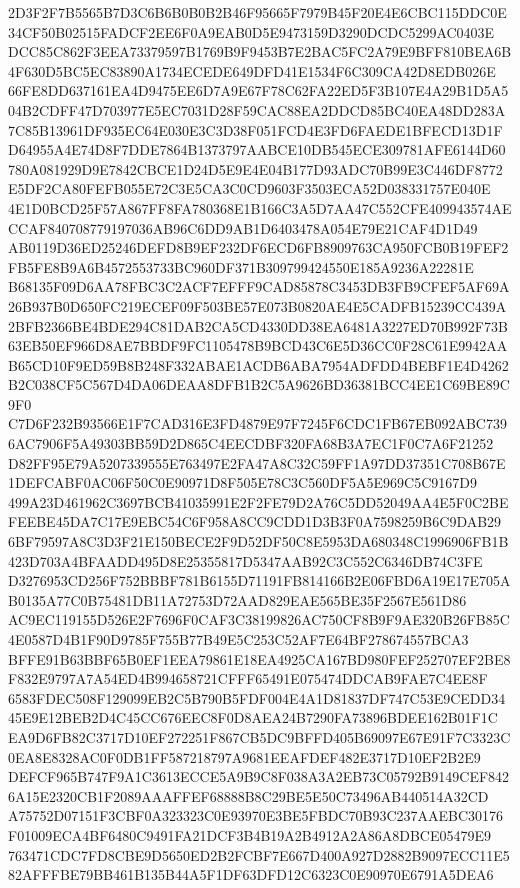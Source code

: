 \documentclass[UTF8,fontset=fandol,zihao=-4,a4paper]{ctexart}
\begin{document}
{{2D3F2F7B5565B7D3C6B6B0B0B2B46F95665F7979B45F20E4E6CBC115DDC0E34CF50B02515FADCF2EE6F0A9EAB0D5E9473159D3290DCDC5299AC0403E
DCC85C862F3EEA73379597B1769B9F9453B7E2BAC5FC2A79E9BFF810BEA6B4F630D5BC5EC83890A1734ECEDE649DFD41E1534F6C309CA42D8EDB026E
66FE8DD637161EA4D9475EE6D7A9E67F78C62FA22ED5F3B107E4A29B1D5A504B2CDFF47D703977E5EC7031D28F59CAC88EA2DDCD85BC40EA48DD283A
7C85B13961DF935EC64E030E3C3D38F051FCD4E3FD6FAEDE1BFECD13D1FD64955A4E74D8F7DDE7864B1373797AABCE10DB545ECE309781AFE6144D60
780A081929D9E7842CBCE1D24D5E9E4E04B177D93ADC70B99E3C446DF8772E5DF2CA80FEFB055E72C3E5CA3C0CD9603F3503ECA52D038331757E040E
4E1D0BCD25F57A867FF8FA780368E1B166C3A5D7AA47C552CFE409943574AECCAF840708779197036AB96C6DD9AB1D6403478A054E79E21CAF4D1D49
AB0119D36ED25246DEFD8B9EF232DF6ECD6FB8909763CA950FCB0B19FEF2FB5FE8B9A6B4572553733BC960DF371B309799424550E185A9236A22281E
B68135F09D6AA78FBC3C2ACF7EFFF9CAD85878C3453DB3FB9CFEF5AF69A26B937B0D650FC219ECEF09F503BE57E073B0820AE4E5CADFB15239CC439A
2BFB2366BE4BDE294C81DAB2CA5CD4330DD38EA6481A3227ED70B992F73B63EB50EF966D8AE7BBDF9FC1105478B9BCD43C6E5D36CC0F28C61E9942AA
B65CD10F9ED59B8B248F332ABAE1ACDB6ABA7954ADFDD4BEBF1E4D4262B2C038CF5C567D4DA06DEAA8DFB1B2C5A9626BD36381BCC4EE1C69BE89C9F0
C7D6F232B93566E1F7CAD316E3FD4879E97F7245F6CDC1FB67EB092ABC7396AC7906F5A49303BB59D2D865C4EECDBF320FA68B3A7EC1F0C7A6F21252
D82FF95E79A5207339555E763497E2FA47A8C32C59FF1A97DD37351C708B67E1DEFCABF0AC06F50C0E90971D8F505E78C3C560DF5A5E969C5C9167D9
499A23D461962C3697BCB41035991E2F2FE79D2A76C5DD52049AA4E5F0C2BEFEEBE45DA7C17E9EBC54C6F958A8CC9CDD1D3B3F0A7598259B6C9DAB29
6BF79597A8C3D3F21E150BECE2F9D52DF50C8E5953DA680348C1996906FB1B423D703A4BFAADD495D8E25355817D5347AAB92C3C552C6346DB74C3FE
D3276953CD256F752BBBF781B6155D71191FB814166B2E06FBD6A19E17E705AB0135A77C0B75481DB11A72753D72AAD829EAE565BE35F2567E561D86
AC9EC119155D526E2F7696F0CAF3C38199826AC750CF8B9F9AE320B26FB85C4E0587D4B1F90D9785F755B77B49E5C253C52AF7E64BF278674557BCA3
BFFE91B63BBF65B0EF1EEA79861E18EA4925CA167BD980FEF252707EF2BE8F832E9797A7A54ED4B994658721CFFF65491E075474DDCAB9FAE7C4EE8F
6583FDEC508F129099EB2C5B790B5FDF004E4A1D81837DF747C53E9CEDD3445E9E12BEB2D4C45CC676EEC8F0D8AEA24B7290FA73896BDEE162B01F1C
EA9D6FB82C3717D10EF272251F867CB5DC9BFFD405B69097E67E91F7C3323C0EA8E8328AC0F0DB1FF587218797A9681EEAFDEF482E3717D10EF2B2E9
DEFCF965B747F9A1C3613ECCE5A9B9C8F038A3A2EB73C05792B9149CEF8426A15E2320CB1F2089AAAFFEF68888B8C29BE5E50C73496AB440514A32CD
A75752D07151F3CBF0A323323C0E93970E3BE5FBDC70B93C237AAEBC30176F01009ECA4BF6480C9491FA21DCF3B4B19A2B4912A2A86A8DBCE05479E9
763471CDC7FD8CBE9D5650ED2B2FCBF7E667D400A927D2882B9097ECC11E582AFFFBE79BB461B135B44A5F1DF63DFD12C6323C0E90970E6791A5DEA6
}}
\end{document}

